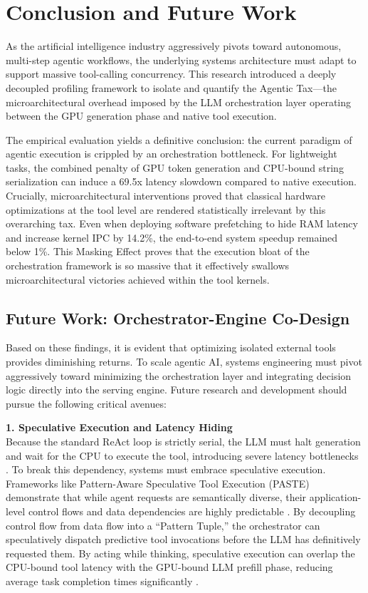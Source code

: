 \documentclass[10pt, letterpaper]{article}
\begin{document}
\section{Conclusion and Future Work}
As the artificial intelligence industry aggressively pivots toward autonomous, multi-step agentic workflows, the underlying systems architecture must adapt to support massive tool-calling concurrency. This research introduced a deeply decoupled profiling framework to isolate and quantify the Agentic Tax---the microarchitectural overhead imposed by the LLM orchestration layer operating between the GPU generation phase and native tool execution.

The empirical evaluation yields a definitive conclusion: the current paradigm of agentic execution is crippled by an orchestration bottleneck. For lightweight tasks, the combined penalty of GPU token generation and CPU-bound string serialization can induce a 69.5x latency slowdown compared to native execution. Crucially, microarchitectural interventions proved that classical hardware optimizations at the tool level are rendered statistically irrelevant by this overarching tax. Even when deploying software prefetching to hide RAM latency and increase kernel IPC by 14.2\%, the end-to-end system speedup remained below 1\%. This Masking Effect proves that the execution bloat of the orchestration framework is so massive that it effectively swallows microarchitectural victories achieved within the tool kernels.

\subsection{Future Work: Orchestrator-Engine Co-Design}
Based on these findings, it is evident that optimizing isolated external tools provides diminishing returns. To scale agentic AI, systems engineering must pivot aggressively toward minimizing the orchestration layer and integrating decision logic directly into the serving engine. Future research and development should pursue the following critical avenues:

\textbf{1. Speculative Execution and Latency Hiding} \\
Because the standard ReAct loop is strictly serial, the LLM must halt generation and wait for the CPU to execute the tool, introducing severe latency bottlenecks \cite{paste}. To break this dependency, systems must embrace speculative execution. Frameworks like Pattern-Aware Speculative Tool Execution (PASTE) demonstrate that while agent requests are semantically diverse, their application-level control flows and data dependencies are highly predictable \cite{paste}. By decoupling control flow from data flow into a ``Pattern Tuple,'' the orchestrator can speculatively dispatch predictive tool invocations before the LLM has definitively requested them. By acting while thinking, speculative execution can overlap the CPU-bound tool latency with the GPU-bound LLM prefill phase, reducing average task completion times significantly \cite{paste}. 
\end{document}
